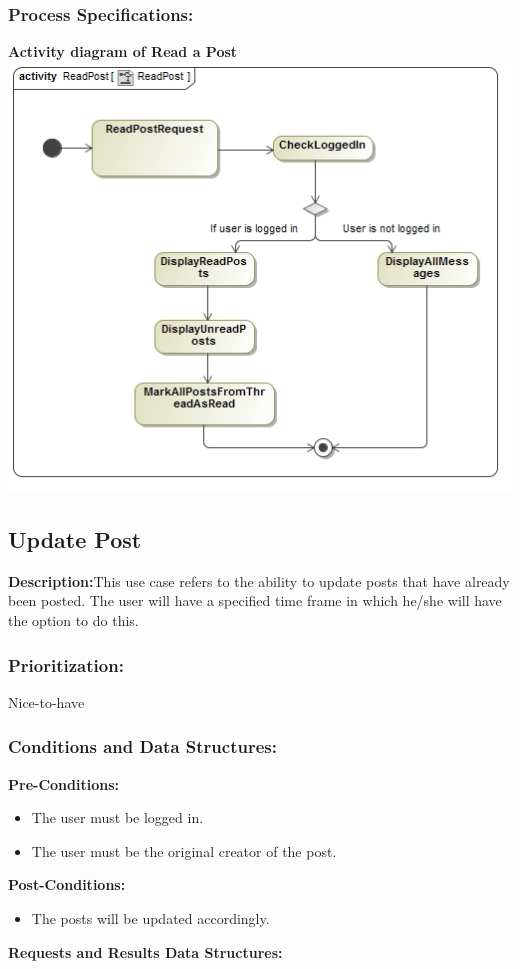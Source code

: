 \documentclass[a4paper,11pt]{article}
\begin{document}
\subsubsection{Process Specifications:} 
\textbf{Activity diagram of Read a Post}\\ 
\includegraphics[width=1\linewidth]{./Images/PostHandling/postReadAct.jpg}\\

\subsection{Update Post}
\textbf{Description:}This use case refers to the ability to update posts that have already been posted. The user will have a specified time frame in which he/she will have the option to do this.  
\subsubsection{Prioritization:} Nice-to-have
\subsubsection{Conditions and Data Structures:}
\textbf{Pre-Conditions:}
\begin{itemize}
	\item The user must be logged in.
	\item The user must be the original creator of the post.
\end{itemize}
\textbf{Post-Conditions:}
\begin{itemize}
	\item The posts will be updated accordingly.
\end{itemize}
\textbf{Requests and Results Data Structures:}
\end{document}
